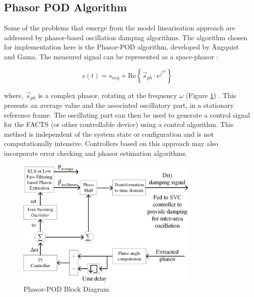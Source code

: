 \documentclass[journal]{IEEEtran}
\begin{document}
\subsection{Phasor POD Algorithm}

Some of the problems that emerge from the model linearisation approach are addressed by phasor-based oscillation damping algorithms. The algorithm chosen for implementation here is the Phasor-POD algorithm, developed by \"{A}ngquist and Gama\cite{PhasorPOD}. The measured signal can be represented as a space-phasor \cite{Chaudhuri}: 

\begin{equation}
s(t)={s}_{avg}+\mathrm{Re}\left\{{\stackrel{\to }{s}}_{ph}\cdot {e}^{{j}^{wt}}\right\}
\end{equation}

where, $\stackrel{\to }{s}_{ph}$ is a complex phasor, rotating at the frequency $\omega$ \cite{PhasorPOD} (Figure \ref{PhasorPODDiagram}) . This presents an average value and the associated oscillatory part, in a stationary reference frame. The oscillating part can then be used to generate a control signal for the FACTS (or other controllable device) using a control algorithm. This method is independent of the system state or configuration and is not computationally intensive. Controllers based on this approach may also incorporate error checking and phasor estimation algorithms.

\begin{figure}[!h]
\centering
\includegraphics[width=3.5in]{PhasorPODAlgorithm.png} 
\caption{Phasor-POD Block Diagram}
\label{PhasorPODDiagram}
\end{figure}
\end{document}
